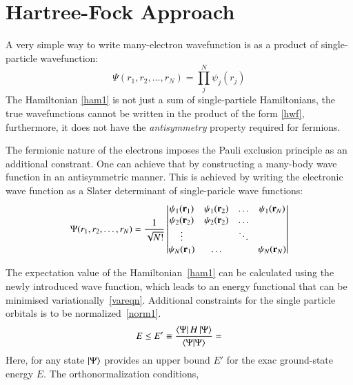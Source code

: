 \section{Hartree-Fock Approach}
A very simple way to write many-electron wavefunction is as a product of single-particle wavefunction:
\begin{equation}\label{hwf}
\Psi(r_1,r_2,\dots,r_N) = \prod_j^N \psi_j(r_j)
\end{equation}
The Hamiltonian \eqref{ham1} is not just a sum of single-particle Hamiltonians, the true wavefunctions cannot be written in the product of the form \eqref{hwf}, furthermore, it does not have the \textit{antisymmetry} property required for fermions.

The fermionic nature of the electrons imposes the Pauli exclusion principle as an additional constrant. One can achieve that by constructing a many-body wave function in an antisymmetric manner. This is achieved by writing the electronic wave function as a Slater determinant of single-paricle wave functions:
\begin{equation}\label{hfwf}
\Psi(r_1,r_2,\dots,r_N) = \frac{1}{\sqrt{N!}}\begin{vmatrix}
\psi_1(\vb{r}_1) & \psi_1(\vb{r}_2) & \dots & \psi_1(\vb{r}_N) \\
\psi_2(\vb{r}_2) & \psi_2(\vb{r}_2) & \dots &					\\
\vdots			 &					& \ddots &					\\
\psi_N(\vb{r}_1) & \dots			&		 &  \psi_N(\vb{r}_N) 
\end{vmatrix}
\end{equation}

The expectation value of the Hamiltonian~\eqref{ham1} can be calculated using the newly introduced wave function, which leads to an energy functional that can be minimised variationally~\eqref{vareqn}. Additional constraints for the single particle orbitals is to be normalized~\eqref{norm1}.
\begin{equation}\label{vareqn}
E \le E' \equiv \frac{\bra{\Psi}H\ket{\Psi}}{\braket{\Psi}{\Psi}} = 
\end{equation}
Here, for any state $\ket{\Psi}$ provides an upper bound $E'$ for the exac ground-state energy $E$. The orthonormalization conditions,

